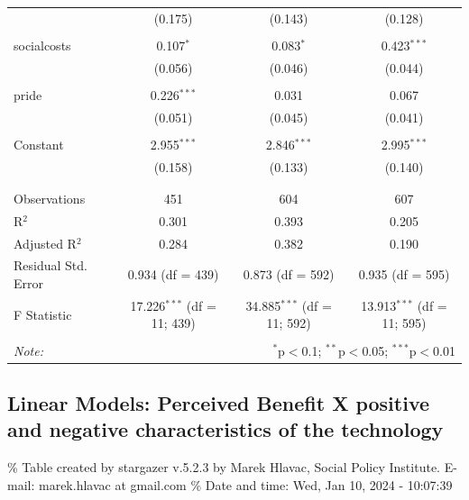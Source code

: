 \documentclass[
]{article}
\begin{document}
\begin{table}[!htbp]
\begin{tabular}{@{\extracolsep{5pt}}lccc}
  & (0.175) & (0.143) & (0.128) \\ 
  & & & \\ 
 socialcosts & 0.107$^{*}$ & 0.083$^{*}$ & 0.423$^{***}$ \\ 
  & (0.056) & (0.046) & (0.044) \\ 
  & & & \\ 
 pride & 0.226$^{***}$ & 0.031 & 0.067 \\ 
  & (0.051) & (0.045) & (0.041) \\ 
  & & & \\ 
 Constant & 2.955$^{***}$ & 2.846$^{***}$ & 2.995$^{***}$ \\ 
  & (0.158) & (0.133) & (0.140) \\ 
  & & & \\ 
\hline \\[-1.8ex] 
Observations & 451 & 604 & 607 \\ 
R$^{2}$ & 0.301 & 0.393 & 0.205 \\ 
Adjusted R$^{2}$ & 0.284 & 0.382 & 0.190 \\ 
Residual Std. Error & 0.934 (df = 439) & 0.873 (df = 592) & 0.935 (df = 595) \\ 
F Statistic & 17.226$^{***}$ (df = 11; 439) & 34.885$^{***}$ (df = 11; 592) & 13.913$^{***}$ (df = 11; 595) \\ 
\hline 
\hline \\[-1.8ex] 
\textit{Note:}  & \multicolumn{3}{r}{$^{*}$p$<$0.1; $^{**}$p$<$0.05; $^{***}$p$<$0.01} \\ 
\end{tabular} 
\end{table} 
\endgroup

\newpage

\hypertarget{linear-models-perceived-benefit-x-positive-and-negative-characteristics-of-the-technology}{%
\subsection{Linear Models: Perceived Benefit X positive and negative
characteristics of the
technology}\label{linear-models-perceived-benefit-x-positive-and-negative-characteristics-of-the-technology}}

\begingroup\setlength{\tabcolsep}{1pt}

\renewcommand{\arraystretch}{0.7}

\% Table created by stargazer v.5.2.3 by Marek Hlavac, Social Policy
Institute. E-mail: marek.hlavac at gmail.com \% Date and time: Wed, Jan
10, 2024 - 10:07:39
\end{document}
